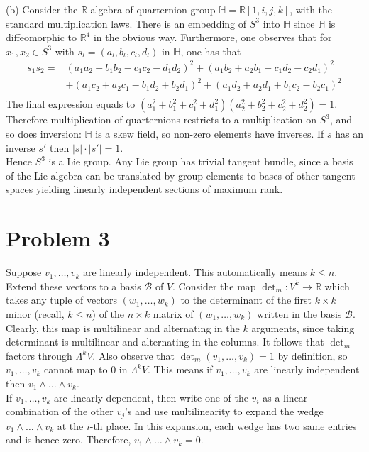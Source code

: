 \documentclass{amsart}
\numberwithin{equation}{section}
\theoremstyle{plain}
\theoremstyle{definition}
\theoremstyle{remark}
\renewcommand{\_}[2]{\underbrace{#1}_{#2}}
\renewcommand{\^}[2]{\overbrace{#1}_{#2}}
\newcommand{\R}{\mathbb{R}}
\renewcommand{\H}{\mathbb{H}}
\begin{document}
(b) Consider the $\R$-algebra of quarternion group $\H = \R[1,i,j,k]$, with the standard multiplication laws. There is an embedding of $S^3$ into $\H$ since $\H$ is diffeomorphic to $\R^4$ in the obvious way. Furthermore, one observes that for $x_1,x_2 \in S^3$ with $s_l = (a_l,b_l,c_l,d_l)$ in $\H$, one has that
\begin{align*}
  s_1s_2 = &(a_1a_2 -b_1b_2 -c_1c_2 -d_1d_2)^2 + (a_1b_2 + a_2b_1 + c_1d_2 - c_2d_1)^2 \\
          &+(a_1c_2 + a_2c_1 -b_1d_2 + b_2d_1)^2 + (a_1d_2 + a_2d_1 + b_1c_2 - b_2c_1)^2 \\
\end{align*}
The final expression equals to $(a_1^2 + b_1^2 + c_1^2 + d_1^2)(a_2^2+b_2^2+c_2^2+d_2^2) = 1$. Therefore multiplication of quarternions restricts to a multiplication on $S^3$, and so does inversion: $\H$ is a skew field, so non-zero elements have inverses. If $s$ has an inverse $s'$ then $|s|\cdot |s'| = 1$. \\

Hence $S^3$ is a Lie group. Any Lie group has trivial tangent bundle, since a basis of the Lie algebra can be translated by group elements to bases of other tangent spaces yielding linearly independent sections of maximum rank.

\section*{Problem 3}
Suppose $v_1, \dots, v_k$ are linearly independent. This automatically means $k \leq n$. Extend these vectors to a basis $\mathcal B$ of $V$. Consider the map $\det_m: V^k \to \R$ which takes any tuple of vectors $(w_1, \dots, w_k)$ to the determinant of the first $k\times k$ minor (recall, $k\leq n$) of the $n\times k$ matrix of $(w_1,\dots,w_k)$ written in the basis $\mathcal B$. Clearly, this map is multilinear and alternating in the $k$ arguments, since taking determinant is multilinear and alternating in the columns. It follows that $\det_m$ factors through $\Lambda^k V$. Also observe that $\det_m(v_1,\dots, v_k) = 1$ by definition, so $v_1, \dots, v_k$ cannot map to $0$ in $\Lambda^k V$. This means if $v_1, \dots, v_k$ are linearly independent then $v_1 \wedge \dots \wedge v_k$.\\

If $v_1, \dots, v_k$ are linearly dependent, then write one of the $v_i$ as a linear combination of the other $v_j$'s and use multilinearity to expand the wedge $v_1\wedge \dots \wedge v_k$ at the $i$-th place. In this expansion, each wedge has two same entries and is hence zero. Therefore, $v_1 \wedge \dots \wedge v_k = 0$. 
\end{document}

